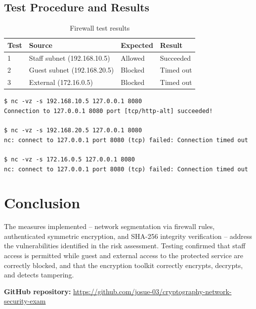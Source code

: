\documentclass[11pt]{article}
\begin{document}
\subsection{Test Procedure and Results}
\begin{table}[h]
\centering
\begin{tabular}{llll}
\toprule
Test & Source & Expected & Result \\
\midrule
1 & Staff subnet (192.168.10.5) & Allowed & Succeeded \\
2 & Guest subnet (192.168.20.5) & Blocked & Timed out \\
3 & External (172.16.0.5) & Blocked & Timed out \\
\bottomrule
\end{tabular}
\caption{Firewall test results}
\end{table}

\begin{lstlisting}
$ nc -vz -s 192.168.10.5 127.0.0.1 8080
Connection to 127.0.0.1 8080 port [tcp/http-alt] succeeded!

$ nc -vz -s 192.168.20.5 127.0.0.1 8080
nc: connect to 127.0.0.1 port 8080 (tcp) failed: Connection timed out

$ nc -vz -s 172.16.0.5 127.0.0.1 8080
nc: connect to 127.0.0.1 port 8080 (tcp) failed: Connection timed out
\end{lstlisting}

\section{Conclusion}
The measures implemented -- network segmentation via firewall rules, authenticated symmetric encryption, and SHA-256 integrity verification -- address the vulnerabilities identified in the risk assessment. Testing confirmed that staff access is permitted while guest and external access to the protected service are correctly blocked, and that the encryption toolkit correctly encrypts, decrypts, and detects tampering.

\vspace{1em}
\noindent\textbf{GitHub repository:} \url{https://github.com/josue-03/cryptography-network-security-exam}
\end{document}
